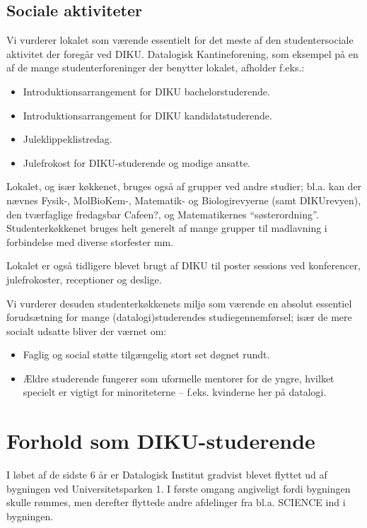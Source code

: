 \documentclass{article}
\begin{document}
\subsection{Sociale aktiviteter}

Vi vurderer lokalet som værende essentielt for det meste af den
studentersociale aktivitet der foregår ved DIKU. Datalogisk Kantineforening,
som eksempel på en af de mange studenterforeninger der benytter lokalet, afholder f.eks.:

\begin{itemize}
\itemsep0em 
\item Introduktionsarrangement for DIKU bachelorstuderende.
\item Introduktionsarrangement for DIKU kandidatstuderende.
\item Juleklippeklistredag.
\item Julefrokost for DIKU-studerende og modige ansatte.
\end{itemize}

Lokalet, og især køkkenet, bruges også af grupper ved andre studier; bl.a. kan
der nævnes Fysik-, MolBioKem-, Matematik- og  Biologirevyerne (samt
DIKUrevyen), den tværfaglige fredagsbar Cafeen?, og Matematikernes
``søsterordning''. Studenterkøkkenet bruges helt generelt af mange grupper til
madlavning i forbindelse med diverse storfester mm.

Lokalet er også tidligere blevet brugt af DIKU til poster sessions ved konferencer,
julefrokoster, receptioner og deslige.

Vi vurderer desuden studenterkøkkenets miljø som værende en absolut essentiel
forudsætning for mange (datalogi)studerendes studiegennemførsel; især de mere
socialt udsatte bliver der værnet om:

\begin{itemize}
\itemsep0em 
\item Faglig og social støtte tilgængelig stort set døgnet rundt.
\item Ældre studerende fungerer som uformelle mentorer for de yngre, hvilket
specielt er vigtigt for minoriteterne -- f.eks.  kvinderne her på datalogi. 
\end{itemize}

\section{Forhold som DIKU-studerende}

I løbet af de sidste 6 år er Datalogisk Institut gradvist blevet flyttet ud af
bygningen ved Universitetsparken 1. I første omgang angiveligt fordi bygningen
skulle rømmes, men derefter flyttede andre afdelinger fra bl.a. SCIENCE ind i
bygningen.
\end{document}
